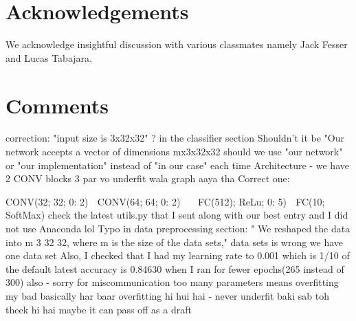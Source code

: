 \documentclass[]{article}
\begin{document}
\section*{Acknowledgements}
We acknowledge insightful discussion with various classmates namely Jack Fesser and Lucas Tabajara.

\section{Comments}
correction:
"input size is 3x32x32" ? in the classifier section
Shouldn't it be 
"Our network accepts a vector of dimensions mx3x32x32
should we use "our network" or "our implementation" instead of "in our case" each time
Architecture - we have 2 CONV blocks
3 par vo underfit wala graph aaya tha
Correct one:
 
CONV(32;  32;  0: 2) 􀀀  CONV(64;  64;  0: 2) 􀀀􀀀
􀀀 FC(512);  ReLu;  0: 5) 􀀀  FC(10;  SoftMax)
check the latest utils.py that I sent along with our best entry
and I did not use Anaconda lol
Typo in data preprocessing section:
"  We reshaped the
data into m   3   32   32, where m  is the size of the data sets,"
data sets is wrong we have one data set
Also, I checked that I had my learning rate to 0.001 which is 1/10 of the default
latest accuracy is 0.84630 when I ran for fewer epochs(265 instead of 300)
also - sorry for miscommunication too many parameters means overfitting
my bad
basically har baar overfitting hi hui hai - never underfit
baki sab toh theek hi hai
maybe it can pass off as a draft


\end{document}
